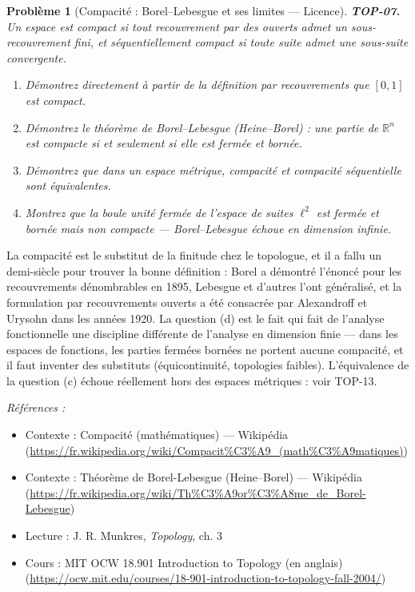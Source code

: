 \documentclass[11pt]{article}
\newtheorem{problem}{Problème}
\newenvironment{refs}{\par\small\noindent\emph{Références :}\begin{itemize}\setlength\itemsep{0pt}}{\end{itemize}\normalsize}
\begin{document}
\bigskip

\begin{problem}[{Compacité : Borel--Lebesgue et ses limites --- Licence}]
\textbf{TOP-07.} Un espace est \textit{compact} si tout recouvrement par des ouverts admet un
sous-recouvrement fini, et \textit{séquentiellement compact} si toute suite admet une sous-suite
convergente.
\begin{enumerate}
\item[(a)] Démontrez directement à partir de la définition par recouvrements que $ [0,1] $ est
compact.
\item[(b)] Démontrez le théorème de Borel--Lebesgue (Heine--Borel) : une partie de $ \mathbb{R}^n $ est
compacte si et seulement si elle est fermée et bornée.
\item[(c)] Démontrez que dans un espace métrique, compacité et compacité séquentielle sont
équivalentes.
\item[(d)] Montrez que la boule unité fermée de l'espace de suites $ \ell^2 $ est fermée et bornée mais non
compacte --- Borel--Lebesgue échoue en dimension infinie.
\end{enumerate}

\end{problem}

\noindent La compacité est le substitut de la finitude chez le topologue, et il a fallu un
demi-siècle pour trouver la bonne définition : Borel a démontré l'énoncé pour les recouvrements
dénombrables en 1895, Lebesgue et d'autres l'ont généralisé, et la formulation par recouvrements ouverts
a été consacrée par Alexandroff et Urysohn dans les années 1920. La question (d) est le fait qui fait de
l'analyse fonctionnelle une discipline différente de l'analyse en dimension finie --- dans les espaces de
fonctions, les parties fermées bornées ne portent aucune compacité, et il faut inventer des substituts
(équicontinuité, topologies faibles). L'équivalence de la question (c) échoue réellement hors des espaces
métriques : voir TOP-13.

\begin{refs}
\item Contexte : Compacité (mathématiques) --- Wikipédia (\url{https://fr.wikipedia.org/wiki/Compacit%C3%A9_(math%C3%A9matiques)})
\item Contexte : Théorème de Borel-Lebesgue (Heine--Borel) --- Wikipédia (\url{https://fr.wikipedia.org/wiki/Th%C3%A9or%C3%A8me_de_Borel-Lebesgue})
\item Lecture : J. R. Munkres, \textit{Topology}, ch. 3
\item Cours : MIT OCW 18.901 Introduction to Topology (en anglais) (\url{https://ocw.mit.edu/courses/18-901-introduction-to-topology-fall-2004/})
\end{refs}
\end{document}
